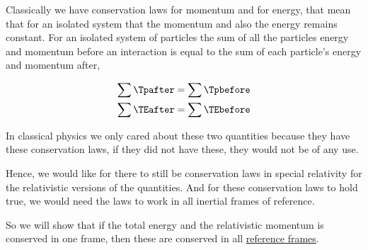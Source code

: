 Classically we have conservation laws for momentum and for energy, that mean that for an isolated system that the momentum and also the energy remains constant.
For an isolated system of particles the sum of all the particles energy and momentum before an interaction is equal to the sum of each particle's energy and momentum after,

\begin{equation}
	\begin{aligned}
		\sum \Tpafter  & = \sum \Tpbefore  \\
		\sum \TEafter  & = \sum \TEbefore
	\end{aligned}
\end{equation}

In classical physics we only cared about these two quantities because they have these conservation laws, if they did not have these, they would not be of any use.

Hence, we would like for there to still be conservation laws in special relativity for the relativistic versions of the quantities.
And for these conservation laws to hold true, we would need the laws to work in all inertial frames of reference.

So we will show that if the total energy and the relativistic momentum is conserved in one frame, then these are conserved in all \hyperlink{def-Reference-frame}{reference frames}.

